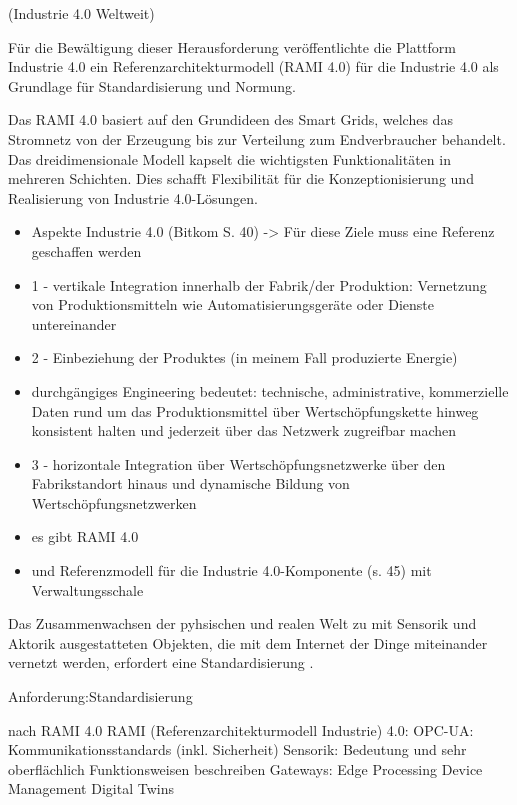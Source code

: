 (Industrie 4.0 Weltweit)

 Für die Bewältigung dieser Herausforderung veröffentlichte die Plattform Industrie 4.0 ein Referenzarchitekturmodell (RAMI 4.0) für die Industrie 4.0 als Grundlage für Standardisierung und Normung.

Das RAMI 4.0 basiert auf den Grundideen des Smart Grids, welches das Stromnetz von der Erzeugung bis zur Verteilung zum Endverbraucher behandelt. Das dreidimensionale Modell kapselt die wichtigsten Funktionalitäten in mehreren Schichten. Dies schafft Flexibilität für die Konzeptionisierung und Realisierung von Industrie 4.0-Lösungen.

\begin{itemize}
  \item Aspekte Industrie 4.0 (Bitkom S. 40) -> Für diese Ziele muss eine Referenz geschaffen werden
  \item 1 - vertikale Integration innerhalb der Fabrik/der Produktion: Vernetzung von Produktionsmitteln wie Automatisierungsgeräte oder Dienste untereinander
  \item 2 - Einbeziehung der Produktes (in meinem Fall produzierte Energie)
  \item durchgängiges Engineering bedeutet: technische, administrative, kommerzielle Daten rund um das Produktionsmittel über Wertschöpfungskette hinweg konsistent halten und jederzeit über das Netzwerk zugreifbar machen
  \item 3 - horizontale Integration über Wertschöpfungsnetzwerke über den Fabrikstandort hinaus und dynamische Bildung von Wertschöpfungsnetzwerken
  \item es gibt RAMI 4.0
  \item und Referenzmodell für die Industrie 4.0-Komponente (s. 45) mit Verwaltungsschale
\end{itemize}



Das Zusammenwachsen der pyhsischen und realen Welt zu mit Sensorik und Aktorik ausgestatteten Objekten, die mit dem Internet der Dinge miteinander vernetzt werden, erfordert eine Standardisierung \citep{BITKOM2015}.



Anforderung:Standardisierung


nach RAMI 4.0
RAMI (Referenzarchitekturmodell Industrie) 4.0: OPC-UA: Kommunikationsstandards (inkl. Sicherheit)
Sensorik: Bedeutung und sehr oberflächlich Funktionsweisen beschreiben
Gateways: Edge Processing
Device Management
Digital Twins


